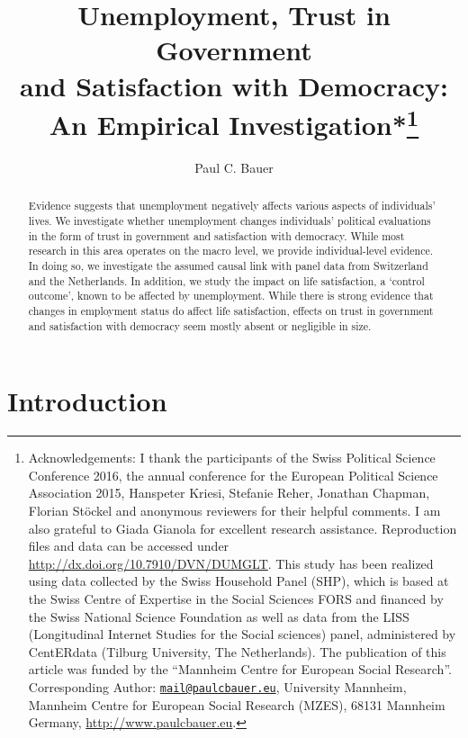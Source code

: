 \documentclass[12pt,]{article}
\title{Unemployment, Trust in Government\\
and Satisfaction with Democracy:\\
An Empirical Investigation*\footnote{Acknowledgements: I thank the participants of the Swiss Political Science Conference 2016, the annual conference for the European Political Science Association 2015, Hanspeter Kriesi, Stefanie Reher, Jonathan Chapman, Florian Stöckel and anonymous reviewers for their helpful comments. I am also grateful to Giada Gianola for excellent research assistance. Reproduction files and data can be accessed under \url{http://dx.doi.org/10.7910/DVN/DUMGLT}. This study has been realized using data collected by the Swiss Household Panel (SHP), which is based at the Swiss Centre of Expertise in the Social Sciences FORS and financed by the Swiss National Science Foundation as well as data from the LISS (Longitudinal Internet Studies for the Social sciences) panel, administered by CentERdata (Tilburg University, The Netherlands). The publication of this article was funded by the ``Mannheim Centre for European Social Research''. Corresponding Author: \href{mailto:mail@paulcbauer.eu}{\nolinkurl{mail@paulcbauer.eu}}, University Mannheim, Mannheim Centre for European Social Research (MZES), 68131 Mannheim Germany, \url{http://www.paulcbauer.eu}.}}
\author{Paul C. Bauer}
\date{}
\begin{document}
\maketitle
\begin{abstract}
\noindent{}Evidence suggests that unemployment negatively affects various aspects of individuals' lives. We investigate whether unemployment changes individuals' political evaluations in the form of trust in government and satisfaction with democracy. While most research in this area operates on the macro level, we provide individual-level evidence. In doing so, we investigate the assumed causal link with panel data from Switzerland and the Netherlands. In addition, we study the impact on life satisfaction, a `control outcome', known to be affected by unemployment. While there is strong evidence that changes in employment status do affect life satisfaction, effects on trust in government and satisfaction with democracy seem mostly absent or negligible in size. \vspace{.8cm}
\end{abstract}

\newcommand*{\secref}[1]{Section~\ref{#1}}

\setlength{\tabcolsep}{2pt}

\hypertarget{introduction}{%
\section{Introduction}\label{introduction}}
\end{document}
